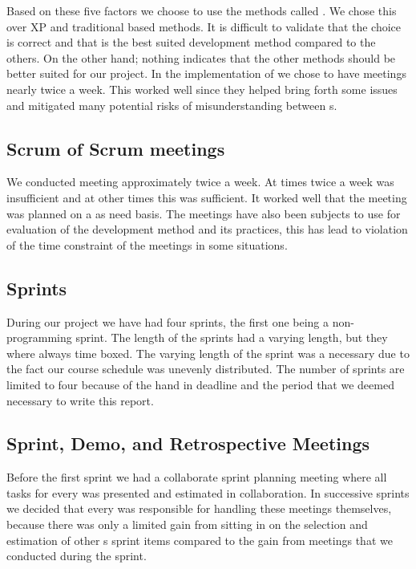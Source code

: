 Based on these five factors we choose to use the \scrum{} methods called \sos{}.  
We chose this over XP and traditional based methods.
It is difficult to validate that the choice is correct and that \sos{} is the best suited development method compared to the others.
On the other hand; nothing indicates that the other methods should be better suited for our project. 
In the implementation of \sos{} we chose to have \sos{} meetings nearly twice a week.
This worked well since they helped bring forth some issues and mitigated many potential risks of misunderstanding between \subgroup{}s.

\subsection{Scrum of Scrum meetings}
We conducted \sos{} meeting approximately twice a week. 
At times twice a week was insufficient and at other times this was sufficient.
It worked well that the meeting was planned on a as need basis.
The \sos{} meetings have also been subjects to use for evaluation of the development method and its practices, this has lead to violation of the time constraint of the \sos{} meetings in some situations.


\subsection{Sprints}
During our project we have had four sprints, the first one being a non-programming sprint.
The length of the sprints had a varying length, but they where always time boxed. 
The varying length of the sprint was a necessary due to the fact our course schedule was unevenly distributed. 
The number of sprints are limited to four because of the hand in deadline and the period that we deemed necessary to write this report.




\subsection{Sprint, Demo, and Retrospective Meetings}
Before the first sprint we had a collaborate sprint planning meeting where all tasks for every \subgroup{} was presented and estimated in collaboration.
In successive sprints we decided that every \subgroup{} was responsible for handling these meetings themselves, because there was only a limited gain from sitting in on the selection and estimation of other \subgroup{}s sprint items compared to the gain from \sos{} meetings that we conducted during the sprint.

